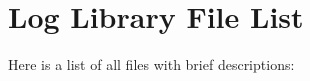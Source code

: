 \section{Log Library File List}
Here is a list of all files with brief descriptions:\begin{CompactList}
\item{}
\item{}
\end{CompactList}
